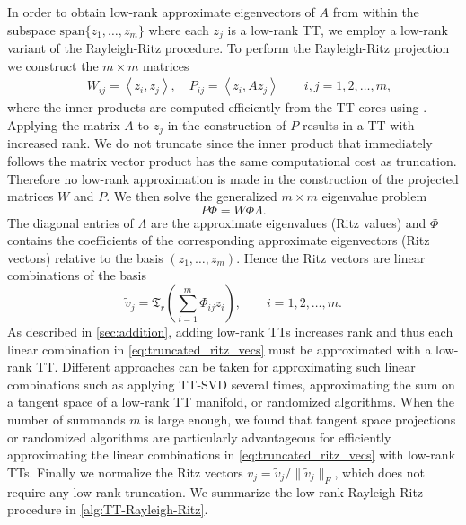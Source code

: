 \documentclass[10pt,preprint]{elsarticle}
\begin{document}
In order to obtain low-rank approximate eigenvectors of $A$ from within the subspace $\text{span}\{z_1,\ldots,z_m\}$ where each $z_j$ is a low-rank TT, we employ a low-rank variant of the Rayleigh-Ritz procedure. To perform the Rayleigh-Ritz projection we construct the $m \times m$ matrices 
\begin{equation}
\label{projection_mats_RR}
\begin{aligned}
\quad W_{ij} = \left\langle z_i,z_j\right\rangle, \quad P_{ij} = \left\langle z_i,A z_j \right\rangle \qquad  i,j = 1,2,\ldots,m, 
\end{aligned}
\end{equation}
where the inner products are computed efficiently from the TT-cores using \cite[Algorithm 4]{oseledets2011tensor}. Applying the matrix $A$ to $z_j$ in the construction of $P$ results in a TT with increased rank. We do not truncate since the inner product that immediately follows the matrix vector product has the same computational cost as truncation. Therefore no low-rank approximation is made in the construction of the projected matrices $W$ and $P$. We then solve the generalized $m \times m$ eigenvalue problem 
\begin{equation} 
\label{gen_eig}
P \Phi = W \Phi{\Lambda} . 
\end{equation} 
The diagonal entries of ${\Lambda}$ are the approximate eigenvalues (Ritz values) and $\Phi$ contains the coefficients of the corresponding approximate eigenvectors (Ritz vectors) relative to the basis $(z_1,\ldots,z_m)$. Hence the Ritz vectors are linear combinations of the basis 
\begin{equation}
\label{eq:truncated_ritz_vecs}
\tilde{v}_j =  \mathfrak{T}_r 
\left( \sum_{i=1}^m \Phi_{ij} z_i \right), 
\qquad i = 1,2,\ldots,m. 
\end{equation}
As described in \cref{sec:addition}, adding low-rank TTs increases rank and thus each linear combination in \eqref{eq:truncated_ritz_vecs} must be approximated with a low-rank TT. Different approaches can be taken for approximating such linear combinations such as applying TT-SVD several times, approximating the sum on a tangent space of a low-rank TT manifold, or randomized algorithms. When the number of summands $m$ is large enough, we found that tangent space projections or randomized algorithms are particularly advantageous for efficiently approximating the linear combinations in \eqref{eq:truncated_ritz_vecs} with low-rank TTs. 
%
Finally we normalize the Ritz vectors 
$v_j = \tilde{v}_j/\|\tilde{v}_j\|_F$, which does not require any low-rank truncation. We summarize the low-rank Rayleigh-Ritz procedure in \cref{alg:TT-Rayleigh-Ritz}. 
\end{document}
